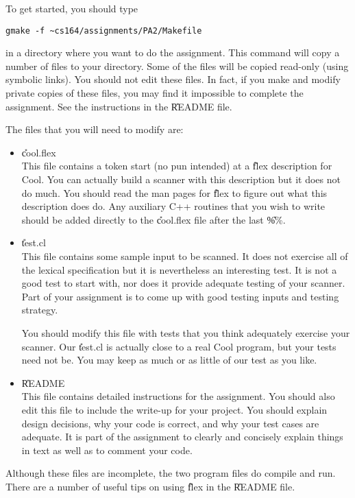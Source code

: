 To get started, you should type
\begin{verbatim}
gmake -f ~cs164/assignments/PA2/Makefile
\end{verbatim}
in a directory where you want to do the assignment.  This command
will copy a number of files to your directory.  Some of the files
will be copied read-only (using symbolic links).  You should not
edit these files.  In fact, if you make and modify private
copies of these files, you may find it impossible to complete the
assignment.  See the instructions in the \U{README} file.

The files that you will need to modify are:
\begin{itemize}
\item \U{cool.flex} \\
This file contains a token start (no pun intended) at a \U{flex} description
for Cool. You can actually build a scanner with this description but
it does not do much. You should read the man pages
for \U{flex} to figure out what this description does do.
Any auxiliary C++ routines that you wish to write should be added directly
to the \U{cool.flex} file after the last \U{\%\%}.

\item \U{test.cl} \\
This file contains some sample input to be scanned. It does not
exercise all of the lexical specification but it is nevertheless an
interesting test.  It is not a good test to start with, nor does it
provide adequate testing of your scanner.  Part of your assignment is
to come up with good testing inputs and testing strategy. 

You should modify this file with tests that you think adequately
exercise your scanner.  Our \U{test.cl} is actually close to a real Cool
program, but your tests need not be.  You may keep as much or as little of our
test as you like.

\item \U{README}\\
This file contains detailed instructions for the assignment.  You should
also edit this file to include the write-up for your
project.  You should explain design decisions, why your code
is correct, and why your test cases are adequate.  It is part of the
assignment to clearly and concisely explain things in text as well as
to comment your code.

\end{itemize}

Although these files are incomplete, the two program files do compile and
run.  There are a number of useful tips on using \U{flex} in the \U{README}
file. 

